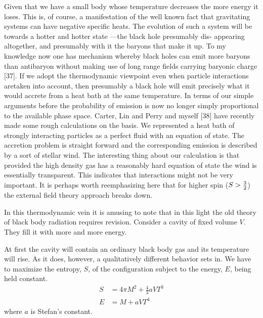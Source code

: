 Given that we have a small body whose temperature decreases the more
energy it loses. This is, of course, a manifestation of the well known fact that
gravitating systems can have negative specific heats. The evolution of such
a system will be towards a hotter and hotter state ---the black hole presumably dis-
appearing altogether, and presumably with it the baryons that make it up. To my
knowledge now one has mechanism whereby black holes can emit more baryons than
antibaryon without making use of long range fields carrying baryonic charge [37].
If we adopt the thermodynamic viewpoint even when particle interactions
aretaken into account, then presumably a black hole will emit precisely what it
would accrete from a heat bath at the same temperature. In terms of our simple
arguments before the probability of emission is now no longer simply proportional
to the available phase space. Carter, Lin and Perry and myself [38] have recently
made some rough calculations on the basis. We represented a heat bath of strongly
interacting particles as a perfect fluid with an equation of state. The accretion
problem is straight forward and the corresponding emission is described by
a sort of stellar wind. The interesting thing about our calculation is that
provided the high density gas has a reasonably hard equation of state the wind is
essentially transparent. This indicates that interactions might not be very
important. It is perhaps worth reemphasizing here that for higher spin
($S > {\small \frac{3}{2}}$) the external field theory approach breaks down.

In this thermodynamic vein it is amusing to note that in this light the
old theory of black body radiation requires revision. Consider a cavity of fixed
volume $V$. They fill it with more and more energy.

At first the cavity will contain an ordinary black body gas and its
temperature will rise. As it does, 
however, a qualitatively different behavior sets
in. We have to maximize the entropy, $S$, of the configuration subject to the
energy, $E$, being held constant.
\begin{align}
S &= 4\pi M^2 + \frac{4}{3}a VT^3\\
E &= M + aVT^4
\end{align}
where $a$ is Stefan's constant.

